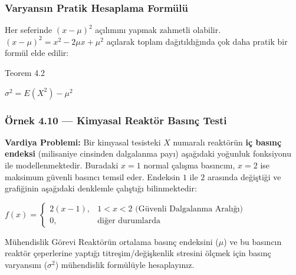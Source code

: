 \documentclass[light]{lutbeamer}
\begin{document}
\begin{frame}[fragile]
  \frametitle[Teorem 4.2]{Varyansın Pratik Hesaplama Formülü}
  Her seferinde $(x - \mu)^2$ açılımını yapmak zahmetli olabilir. $(x-\mu)^2 = x^2 - 2\mu x + \mu^2$ açılarak toplam dağıtıldığında çok daha pratik bir formül elde edilir:

  \begin{center}
    \begin{minipage}{0.8\textwidth}
      \begin{block}{Teorem 4.2}
        \begin{center}
          $\sigma^2 = E(X^2) - \mu^2$
        \end{center}
      \end{block}
    \end{minipage}
  \end{center}

\end{frame}

\begin{frame}[fragile]
  \frametitle{Örnek 4.10 --- Kimyasal Reaktör Basınç Testi}

  \justifying{}
  \small \textbf{Vardiya Problemi:} Bir kimyasal tesisteki $X$ numaralı reaktörün \textbf{iç basınç endeksi} (milisaniye cinsinden dalgalanma payı) aşağıdaki yoğunluk fonksiyonu ile modellenmektedir. Buradaki $x = 1$ normal çalışma basıncını, $x = 2$ ise maksimum güvenli basıncı temsil eder. Endeksin $1$ ile $2$ arasında değiştiği ve grafiğinin aşağıdaki denklemle çalıştığı bilinmektedir:

  \vspace{0.5em}
  \begin{center}
    $f(x) = \begin{cases} 2(x-1), & 1 < x < 2 \text{ (Güvenli Dalgalanma Aralığı)} \\[2pt] 0, & \text{diğer durumlarda} \end{cases}$
  \end{center}

  \vspace{1em}
  \begin{exampleblock}{Mühendislik Görevi}
    \footnotesize Reaktörün ortalama basınç endeksini ($\mu$) ve bu basıncın reaktör çeperlerine yaptığı titreşim/değişkenlik stresini ölçmek için basınç varyansını ($\sigma^2$) mühendislik formülüyle hesaplayınız.
  \end{exampleblock}
\end{frame}
\end{document}
